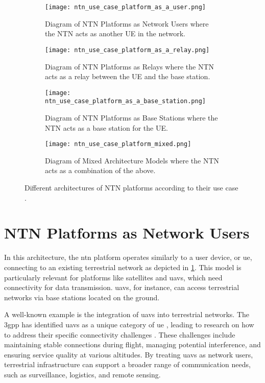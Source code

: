 \begin{figure}
  \begin{subfigure}{0.4\textheight}
    \texttt{[image: ntn\_use\_case\_platform\_as\_a\_user.png]}
    \caption{Diagram of NTN Platforms as Network Users where the NTN acts as another UE in the network.}\label{fig:ntn_platform_as_a_user}
  \end{subfigure}

  \begin{subfigure}{0.4\textheight}
    \texttt{[image: ntn\_use\_case\_platform\_as\_a\_relay.png]}
    \caption{Diagram of NTN Platforms as Relays where the NTN acts as a relay between the UE and the base station.}\label{fig:ntn_platform_as_a_relay}
  \end{subfigure}

  \begin{subfigure}{0.4\textheight}
    \texttt{[image: ntn\_use\_case\_platform\_as\_a\_base\_station.png]}
    \caption{Diagram of NTN Platforms as Base Stations where the NTN acts as a base station for the UE.}\label{fig:ntn_platform_as_a_base_station}
  \end{subfigure}

  \begin{subfigure}{0.4\textheight}
    \texttt{[image: ntn\_use\_case\_platform\_mixed.png]}
    \caption{Diagram of Mixed Architecture Models where the NTN acts as a combination of the above.}\label{fig:mixed_architecture_models}
  \end{subfigure}

  \caption{Different architectures of NTN platforms according to their use case \autocite{evolution_ntn_from_5g_6g_survey}.}\label{fig:ntn_platforms}
\end{figure}

\section{NTN Platforms as Network Users}\label{sec:ntn_platform_as_a_user}

In this architecture, the \gls{ntn} platform operates similarly to a user device, or \gls{ue}, connecting to an existing terrestrial network as depicted in \cref{fig:ntn_platform_as_a_user}. This model is particularly relevant for platforms like satellites and \glspl{uav}, which need connectivity for data transmission. \glspl{uav}, for instance, can access terrestrial networks via base stations located on the ground.

A well-known example is the integration of \glspl{uav} into terrestrial networks. The \gls{3gpp} has identified \glspl{uav} as a unique category of \gls{ue} \autocite{muruganathan2019overview3gpprelease15study}, leading to research on how to address their specific connectivity challenges \autocite{uav_assisted_networks_challenges}. These challenges include maintaining stable connections during flight, managing potential interference, and ensuring service quality at various altitudes. By treating \glspl{uav} as network users, terrestrial infrastructure can support a broader range of communication needs, such as surveillance, logistics, and remote sensing.

